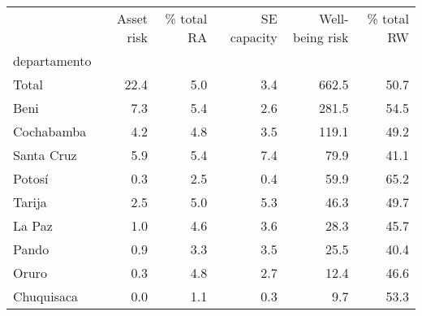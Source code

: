 \begin{tabular}{lrrrrr}
\toprule
{} &  Asset risk &  \% total RA &  SE capacity &  Well-being risk &  \% total RW \\
departamento &             &             &              &                  &             \\
\midrule
Total        &        22.4 &         5.0 &          3.4 &            662.5 &        50.7 \\
Beni         &         7.3 &         5.4 &          2.6 &            281.5 &        54.5 \\
Cochabamba   &         4.2 &         4.8 &          3.5 &            119.1 &        49.2 \\
Santa Cruz   &         5.9 &         5.4 &          7.4 &             79.9 &        41.1 \\
Potosí       &         0.3 &         2.5 &          0.4 &             59.9 &        65.2 \\
Tarija       &         2.5 &         5.0 &          5.3 &             46.3 &        49.7 \\
La Paz       &         1.0 &         4.6 &          3.6 &             28.3 &        45.7 \\
Pando        &         0.9 &         3.3 &          3.5 &             25.5 &        40.4 \\
Oruro        &         0.3 &         4.8 &          2.7 &             12.4 &        46.6 \\
Chuquisaca   &         0.0 &         1.1 &          0.3 &              9.7 &        53.3 \\
\bottomrule
\end{tabular}
